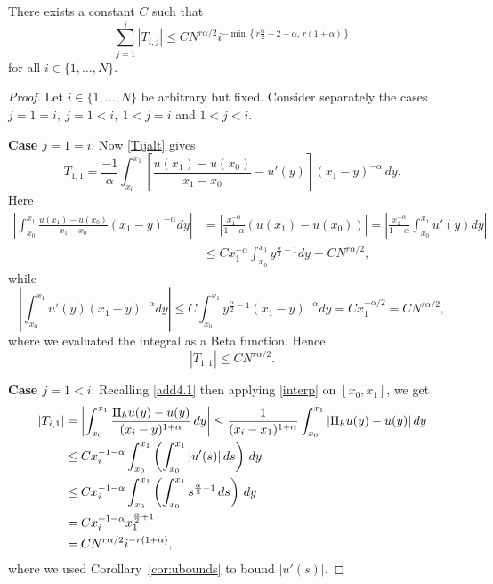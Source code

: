 \documentclass[smallextended]{svjour3}       %
\begin{document}
\begin{lemma}\label{lem4.1imp}
	There exists a constant $C$ such that
	\[
	\sum_{j=1}^{i}{|T_{i,j}|} \le C N^{r\alpha/2} i^{-\min \left\{r\frac{\alpha}{2}+2-\alpha, \, r(1+\alpha)\right\} }
	\]
	for all $i\in\{1, \dots, N\}$.
\end{lemma}
\begin{proof}
	Let $i\in\{1, \dots, N\}$ be arbitrary but fixed.
	Consider separately the cases $j=1=i,\ j=1<i, \ 1< j=i$ and  $1<j<i$.
	
	\textbf{Case $j=1=i$}:
	Now \eqref{Tijalt} gives
	\[
	T_{1,1} = \frac{-1}{\alpha}\int_{x_0}^{x_1}\left[ \frac{u(x_1)-u(x_0)}{x_1-x_0} - u'(y)\right](x_1-y)^{-\alpha} \,dy.
	\]
	Here
	\begin{equation*}
		\begin{split}
			\left| \int_{x_0}^{x_1}{\frac{u(x_1)-u(x_0)}{x_1-x_0}(x_1-y)^{-\alpha}dy} \right|
			& = \left|\frac{x_1^{-\alpha}}{1-\alpha}\left(u(x_1)-u(x_0)\right)\right|
			=\left|\frac{x_1^{-\alpha}}{1-\alpha}\int_{x_0}^{x_1}{u'(y)dy}\right|\\
			& \le Cx_1^{-\alpha}\int_{x_0}^{x_1}{y^{\frac{\alpha}{2}-1}dy}
			= CN^{r\alpha/2},
		\end{split}
	\end{equation*}
	while
	\[
	\left| \int_{x_0}^{x_1} \! {u'(y)(x_1-y)^{-\alpha}dy} \right|
	\le  C \int_{x_0}^{x_1} \! {y^{\frac{\alpha}{2}-1}(x_1-y)^{-\alpha}dy}
	= Cx_1^{-\alpha/2} = CN^{r\alpha/2},
	\]
	where we evaluated the integral as a Beta function.
	Hence
	\begin{equation}\label{T11imp}
		|T_{1,1}|\le CN^{r\alpha/2}.
	\end{equation}
	
	
	\textbf{Case $j=1<i$}:
	Recalling \eqref{add4.1} then applying \eqref{interp} on $[x_0, x_1]$, we get
	\begin{align}
	|T_{i,1}|
	&= \left|\int_{x_0}^{x_1}\frac{\Pi_hu(y)-u(y)}{(x_i-y)^{1+\alpha}} \,dy \right|
		\le\frac1{(x_i-x_1)^{1+\alpha}}\int_{x_0}^{x_1} |\Pi_hu(y)-u(y)| \,dy \notag\\
	&\le Cx_i^{-1-\alpha} \int_{x_0}^{x_1} \left(\int_{x_0}^{x_1} |u'(s)|\,ds\right) \,dy   \notag\\
	&\le Cx_i^{-1-\alpha}\int_{x_0}^{x_1} \left(\int_{x_0}^{x_1} s^{\frac{\alpha}{2}-1}\,ds\right) \,dy  \notag\\
	&= Cx_i^{-1-\alpha}  x_1^{\frac{\alpha}{2}+1}  \notag\\
	&= CN^{r\alpha/2}i^{-r(1+\alpha)}, \label{Ti1imp}
	\end{align}
	where we used Corollary~\ref{cor:ubounds} to bound $|u'(s)|$.
		

\end{proof}
\end{document}
